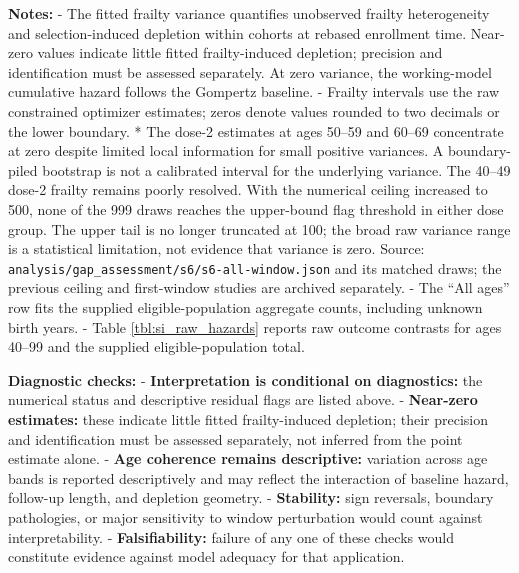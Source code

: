\documentclass[
]{article}
\newcounter{none} %
\begin{document}
\textbf{Notes:} - The fitted frailty variance quantifies unobserved frailty heterogeneity and selection-induced depletion within cohorts at rebased enrollment time. Near-zero values indicate little fitted frailty-induced depletion; precision and identification must be assessed separately. At zero variance, the working-model cumulative hazard follows the Gompertz baseline. - Frailty intervals use the raw constrained optimizer estimates; zeros denote values rounded to two decimals or the lower boundary. * The dose-2 estimates at ages 50--59 and 60--69 concentrate at zero despite limited local information for small positive variances. A boundary-piled bootstrap is not a calibrated interval for the underlying variance. The 40--49 dose-2 frailty remains poorly resolved. With the numerical ceiling increased to 500, none of the 999 draws reaches the upper-bound flag threshold in either dose group. The upper tail is no longer truncated at 100; the broad raw variance range is a statistical limitation, not evidence that variance is zero. Source: \texttt{analysis/gap\_assessment/s6/s6-all-window.json} and its matched draws; the previous ceiling and first-window studies are archived separately. - The ``All ages'' row fits the supplied eligible-population aggregate counts, including unknown birth years. - Table \ref{tbl:si_raw_hazards} reports raw outcome contrasts for ages 40--99 and the supplied eligible-population total.

\textbf{Diagnostic checks:} - \textbf{Interpretation is conditional on diagnostics:} the numerical status and descriptive residual flags are listed above. - \textbf{Near-zero estimates:} these indicate little fitted frailty-induced depletion; their precision and identification must be assessed separately, not inferred from the point estimate alone. - \textbf{Age coherence remains descriptive:} variation across age bands is reported descriptively and may reflect the interaction of baseline hazard, follow-up length, and depletion geometry. - \textbf{Stability:} sign reversals, boundary pathologies, or major sensitivity to window perturbation would count against interpretability. - \textbf{Falsifiability:} failure of any one of these checks would constitute evidence against model adequacy for that application.

\newpage
\end{document}
